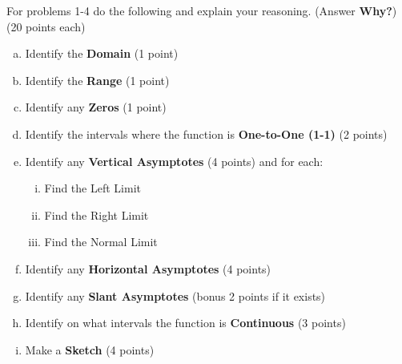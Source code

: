 \documentclass[11pt]{article}
\begin{document}
	For problems 1-4 do the following and explain your reasoning.  (Answer {\bf Why?}) (20 points each)
	\begin{enumerate}[a)]
		\item  Identify the {\bf Domain} (1 point)
		\item  Identify the {\bf Range} (1 point)
		\item  Identify any {\bf Zeros} (1 point)
		\item  Identify the intervals where the function is {\bf One-to-One (1-1)} (2 points)
		\item  Identify any {\bf Vertical Asymptotes} (4 points) and for each:
		\begin{enumerate}[i)]
			\item  Find the Left Limit
			\item  Find the Right Limit
			\item  Find the Normal Limit
		\end{enumerate}
		\item  Identify any {\bf Horizontal Asymptotes} (4 points)
		\item  Identify any {\bf Slant Asymptotes} (bonus 2 points if it exists)
		\item  Identify on what intervals the function is {\bf Continuous} (3 points)
		\item  Make a {\bf Sketch} (4 points)
	\end{enumerate}
	\newpage
\end{document}
